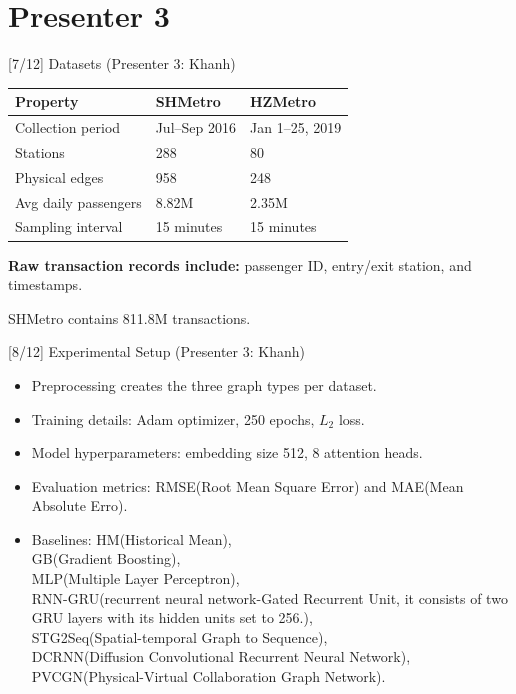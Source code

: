 \documentclass[aspectratio=169]{beamer}
\begin{document}
\section{Presenter 3}


\begin{frame}{[7/12] Datasets (Presenter 3: Khanh)}
\hypertarget{sec:experiments}{}
  \begin{table}
    \centering
    \small
    \begin{tabular}{lll}
      \toprule
      Property & SHMetro & HZMetro \\
      \midrule
      Collection period & Jul--Sep 2016 & Jan 1--25, 2019 \\
      Stations & 288 & 80 \\
      Physical edges & 958 & 248 \\
      Avg daily passengers & 8.82M & 2.35M \\
      Sampling interval & 15 minutes & 15 minutes \\
      \bottomrule
    \end{tabular}
  \end{table}

  \vspace{0.25em}
  \small
  \textbf{Raw transaction records include:}
  passenger ID, entry/exit station, and timestamps.

  \vspace{0.2em}
  \small
  SHMetro contains 811.8M transactions.
\end{frame}

\begin{frame}{[8/12] Experimental Setup (Presenter 3: Khanh)}
  \begin{itemize}
    \item Preprocessing creates the three graph types per dataset.
    \item Training details: Adam optimizer, 250 epochs, \(L_2\) loss.
    \item Model hyperparameters: embedding size 512, 8 attention heads.
    \item Evaluation metrics: RMSE(Root Mean Square Error) and MAE(Mean Absolute Erro).
    \item Baselines: HM(Historical Mean), \\GB(Gradient Boosting), \\MLP(Multiple Layer Perceptron), \\RNN-GRU(recurrent neural network-Gated Recurrent Unit, it consists of two GRU layers with its hidden units set to 256.), \\STG2Seq(Spatial-temporal Graph to Sequence), \\DCRNN(Diffusion Convolutional Recurrent Neural Network), \\PVCGN(Physical-Virtual Collaboration Graph Network).
  \end{itemize}
\end{frame}
\end{document}
